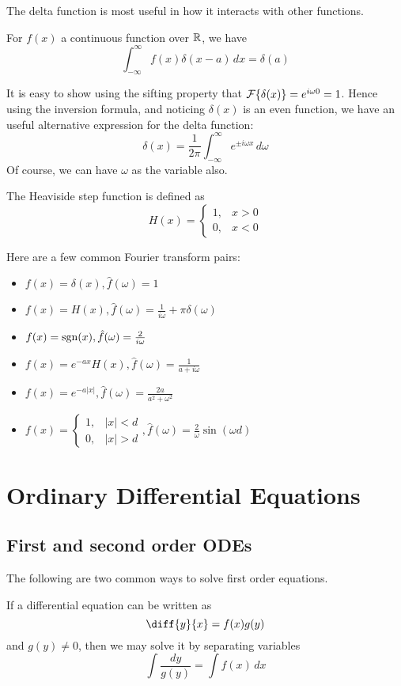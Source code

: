 \documentclass[11pt]{article}
\begin{document}
The delta function is most useful in how it interacts with other functions.
\begin{proposition}
  For \(f(x)\) a continuous function over \(\R\), we have
  \[\int_{-\infty}^{\infty}f(x)\delta(x-a)\,dx=\delta(a)\]
\end{proposition}
It is easy to show using the sifting property that \(\cal{F}\{\delta(x)\}=e^{i\omega 0}=1\). Hence using the inversion formula, and noticing \(\delta(x)\) is an even function, we have an useful alternative expression for the delta function:
\[\delta(x)=\frac{1}{2\pi}\int_{-\infty}^{\infty}e^{\pm i\omega x}\,d\omega\]
Of course, we can have \(\omega\) as the variable also. 
\begin{definition}
  The Heaviside step function is defined as
  \[H(x)=\begin{cases}
    1,&x>0\\0,&x<0
  \end{cases}\]
\end{definition}

Here are a few common Fourier transform pairs:
\begin{itemize}
  \item \(f(x)=\delta(x), \hat{f}(\omega)=1\)
  \item \(f(x)=H(x),\hat{f}(\omega)=\frac{1}{i\omega}+\pi\delta(\omega)\)
  \item \(f(x)=\rm{sgn}(x),\hat{f}(\omega)=\frac{2}{i\omega}\)
  \item \(f(x)=e^{-ax}H(x),\hat{f}(\omega)=\frac{1}{a+i\omega}\)
  \item \(f(x)=e^{-a|x|},\hat{f}(\omega)=\frac{2a}{a^2+\omega^2}\)
  \item \(f(x)=\begin{cases}
    1, & |x|<d\\ 0, & |x|>d
  \end{cases}, \hat{f}(\omega)=\frac{2}{\omega}\sin(\omega d)\)
\end{itemize}

\section{Ordinary Differential Equations}
\subsection{First and second order ODEs}
The following are two common ways to solve first order equations.
\begin{theorem}
  If a differential equation can be written as \[\diff{y}{x}=f(x)g(y)\] and \(g(y)\neq 0\), then we may solve it by separating variables
  \[\int \frac{dy}{g(y)} = \int f(x)\,dx\]
\end{theorem}
\end{document}

